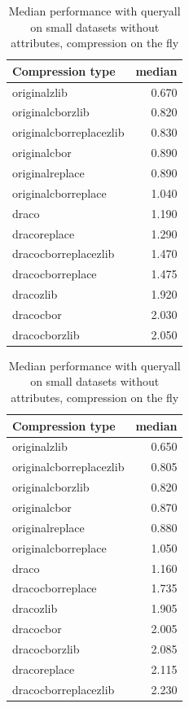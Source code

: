 \begin{table}[!h]
    \begin{minipage}{.5\linewidth}
      \caption{
Median performance with queryall on small datasets, compression on the fly}
\centering

\begin{tabular}{|l|r|}
\hline
Compression type & median\\
\hline
originalzlib & 0.670\\
\hline
originalcborzlib & 0.820\\
\hline
originalcborreplacezlib & 0.830\\
\hline
originalcbor & 0.890\\
\hline
originalreplace & 0.890\\
\hline
originalcborreplace & 1.040\\
\hline
draco & 1.190\\
\hline
dracoreplace & 1.290\\
\hline
dracocborreplacezlib & 1.470\\
\hline
dracocborreplace & 1.475\\
\hline
dracozlib & 1.920\\
\hline
dracocbor & 2.030\\
\hline
dracocborzlib & 2.050\\
\hline
\end{tabular}
\end{minipage}%
    \begin{minipage}{.5\linewidth}
      \centering
        \caption{
Median performance with queryall on small datasets without attributes, compression on the fly}

\begin{tabular}{|l|r|}
\hline
Compression type & median\\
\hline
originalzlib & 0.650\\
\hline
originalcborreplacezlib & 0.805\\
\hline
originalcborzlib & 0.820\\
\hline
originalcbor & 0.870\\
\hline
originalreplace & 0.880\\
\hline
originalcborreplace & 1.050\\
\hline
draco & 1.160\\
\hline
dracocborreplace & 1.735\\
\hline
dracozlib & 1.905\\
\hline
dracocbor & 2.005\\
\hline
dracocborzlib & 2.085\\
\hline
dracoreplace & 2.115\\
\hline
dracocborreplacezlib & 2.230\\
\hline
\end{tabular}
\end{minipage} 
\end{table}

